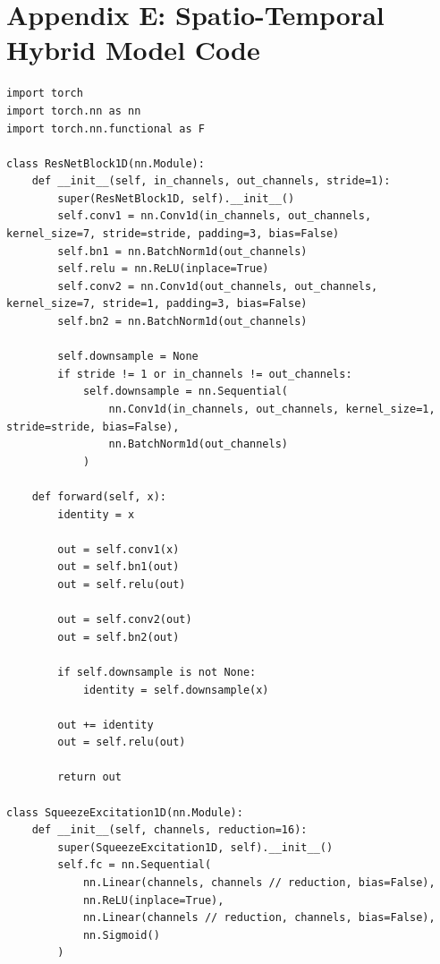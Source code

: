 \documentclass[12pt,a4paper]{report}
\begin{document}
\clearpage

\chapter*{Appendix E: Spatio-Temporal Hybrid Model Code}
\label{app:hybrid}

\begin{lstlisting}[caption={Spatio-Temporal Hybrid Model (ResNet-Transformer) Architecture (src/models/hybrid.py)}]
import torch
import torch.nn as nn
import torch.nn.functional as F

class ResNetBlock1D(nn.Module):
    def __init__(self, in_channels, out_channels, stride=1):
        super(ResNetBlock1D, self).__init__()
        self.conv1 = nn.Conv1d(in_channels, out_channels, kernel_size=7, stride=stride, padding=3, bias=False)
        self.bn1 = nn.BatchNorm1d(out_channels)
        self.relu = nn.ReLU(inplace=True)
        self.conv2 = nn.Conv1d(out_channels, out_channels, kernel_size=7, stride=1, padding=3, bias=False)
        self.bn2 = nn.BatchNorm1d(out_channels)
        
        self.downsample = None
        if stride != 1 or in_channels != out_channels:
            self.downsample = nn.Sequential(
                nn.Conv1d(in_channels, out_channels, kernel_size=1, stride=stride, bias=False),
                nn.BatchNorm1d(out_channels)
            )

    def forward(self, x):
        identity = x
        
        out = self.conv1(x)
        out = self.bn1(out)
        out = self.relu(out)
        
        out = self.conv2(out)
        out = self.bn2(out)
        
        if self.downsample is not None:
            identity = self.downsample(x)
            
        out += identity
        out = self.relu(out)
        
        return out

class SqueezeExcitation1D(nn.Module):
    def __init__(self, channels, reduction=16):
        super(SqueezeExcitation1D, self).__init__()
        self.fc = nn.Sequential(
            nn.Linear(channels, channels // reduction, bias=False),
            nn.ReLU(inplace=True),
            nn.Linear(channels // reduction, channels, bias=False),
            nn.Sigmoid()
        )
        

\end{lstlisting}
\end{document}
